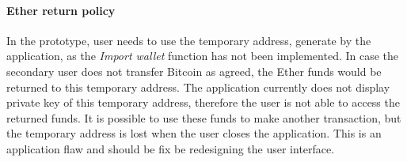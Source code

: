 \paragraph{Ether return policy}
In the prototype, user needs to use the temporary address, generate by the application, as the \textit{Import wallet} function has not been implemented. In case the secondary user does not transfer Bitcoin as agreed, the Ether funds would be returned to this temporary address. The application currently does not display private key of this temporary address, therefore the user is not able to access the returned funds. It is possible to use these funds to make another transaction, but the temporary address is lost when the user closes the application. This is an application flaw and should be fix be redesigning the user interface.